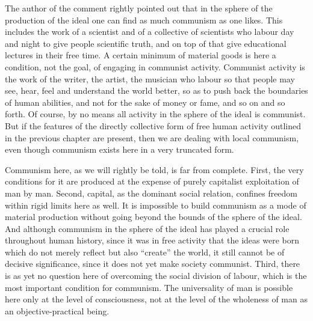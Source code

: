 \documentclass[12pt,a4paper,openany]{book}
\begin{document}
The author of the comment rightly pointed out that in the sphere of the production of the ideal one can find as much communism as one likes. This includes the work of a scientist and of a collective of scientists who labour day and night to give people scientific truth, and on top of that give educational lectures in their free time. A certain minimum of material goods is here a condition, not the goal, of engaging in communist activity. Communist activity is the work of the writer, the artist, the musician who labour so that people may see, hear, feel and understand the world better, so as to push back the boundaries of human abilities, and not for the sake of money or fame, and so on and so forth. Of course, by no means all activity in the sphere of the ideal is communist. But if the features of the directly collective form of free human activity outlined in the previous chapter are present, then we are dealing with local communism, even though communism exists here in a very truncated form.

Communism here, as we will rightly be told, is far from complete. First, the very conditions for it are produced at the expense of purely capitalist exploitation of man by man. Second, capital, as the dominant social relation, confines freedom within rigid limits here as well. It is impossible to build communism as a mode of material production without going beyond the bounds of the sphere of the ideal. And although communism in the sphere of the ideal has played a crucial role throughout human history, since it was in free activity that the ideas were born which do not merely reflect but also “create” the world, it still cannot be of decisive significance, since it does not yet make society communist. Third, there is as yet no question here of overcoming the social division of labour, which is the most important condition for communism. The universality of man is possible here only at the level of consciousness, not at the level of the wholeness of man as an objective-practical being.
\end{document}
